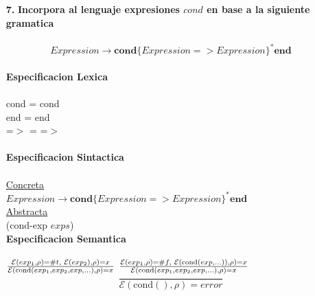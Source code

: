 \documentclass{article}
\begin{document}
\begin{itemize}
    \\
    \item[\textbf{7.}] \textbf{{\Large Incorpora al lenguaje expresiones $cond$ en base a la siguiente gramatica}}\\
    \\
    $$Expression\rightarrow\textbf{cond}\{ Expression=>Expression \}^*\textbf{end}$$
    \\
    \textbf{Especificacion Lexica}\\
    \\
    \hspace*{10mm} cond = cond\\
    \hspace*{10mm} end = end\\
    \hspace*{10mm} =$>$ = =$>$\\
    \\
    \textbf{Especificacion Sintactica}\\
    \\
    \hspace*{10mm} \underline{Concreta}\\
    \hspace*{10mm}$Expression\rightarrow\textbf{cond}\{ Expression=>Expression \}^*\textbf{end}$
    \\
    \hspace*{10mm} \underline{Abstracta}\\
    \hspace*{10mm}(cond-exp $exps$)\\
    \newpage
    \textbf{Especificacion Semantica}\\
    \\
        \hspace*{10mm}
        $\frac
        {\mathcal{E}(exp_1,\rho)=\#t,\hspace{1mm}\mathcal{E}(exp_2),\rho)=x}
        {\mathcal{E}(\text{cond}(exp_1,exp_2,exp,...),\rho)=x}$
        \hspace*{10mm}
        $\frac
        {\mathcal{E}(exp_1,\rho)=\#f,\hspace{1mm}\mathcal{E}(\text{cond}(exp,...)),\rho)=x}
        {\mathcal{E}(\text{cond}(exp_1,exp_2,exp,...),\rho)=x}$\\
        $$\frac
        {}
        {\mathcal{E}(\text{cond}(),\rho)=error}$$
        \\

\end{itemize}
\end{document}
